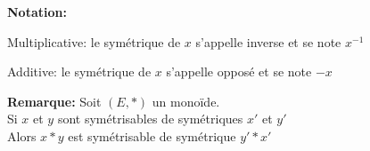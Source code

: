 \documentclass[12pt,twoside,a4paper]{article}
\begin{document}
		\newpage
		\begin{flushleft}
			\textbf{Notation:}
			\begin{liste}
				\item Multiplicative: le sym\'etrique de $x$ s'appelle inverse et se note $x^{-1}$
				\item Additive: le sym\'etrique de $x$ s'appelle oppos\'e et se note $-x$
			\end{liste}
		\end{flushleft}
		\begin{flushleft}
			\textbf{Remarque:}
			Soit $(E,*)$ un mono\"ide.\\
			Si $x$ et $y$ sont sym\'etrisables de sym\'etriques $x'$ et $y'$\\
			Alors $x*y$ est sym\'etrisable de sym\'etrique $y'*x'$
		\end{flushleft}
\end{document}
